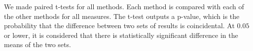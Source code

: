 We made paired t-tests for all methods. Each method is compared with each of the other methods for all measures. The t-test outputs a p-value, which is the probability that the difference between two sets of results is coincidental. At $0.05$ or lower, it is considered that there is statistically significant difference in the means of the two sets.